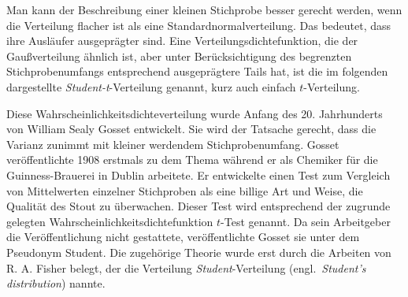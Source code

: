 
Man kann der Beschreibung einer kleinen Stichprobe besser gerecht werden, wenn die
Verteilung flacher ist als eine Standardnormalverteilung. Das bedeutet, dass ihre Ausläufer
ausgeprägter sind.
Eine Verteilungsdichtefunktion, die der Gaußverteilung ähnlich ist, aber unter
Berücksichtigung des begrenzten Stichprobenumfangs entsprechend ausgeprägtere Tails hat,
ist die im folgenden dargestellte \textsl{Student-t}-Verteilung genannt, kurz auch
einfach $t$-Verteilung.


Diese Wahrscheinlichkeitsdichteverteilung wurde Anfang des 20. Jahrhunderts von
William Sealy Gosset entwickelt. Sie wird der
Tatsache gerecht, dass die Varianz zunimmt mit kleiner werdendem Stichprobenumfang.
Gosset veröffentlichte 1908 erstmals zu dem Thema während er als Chemiker für die Guinness-Brauerei
in Dublin arbeitete. Er entwickelte einen Test zum Vergleich von Mittelwerten
einzelner Stichproben als eine billige Art und Weise, die Qualität des Stout
zu überwachen. Dieser Test wird entsprechend der zugrunde gelegten Wahrscheinlichkeitsdichtefunktion
$t$-Test genannt.
Da sein Arbeitgeber die Veröffentlichung nicht gestattete, veröffentlichte Gosset sie unter
dem Pseudonym Student. Die zugehörige Theorie wurde erst durch die
Arbeiten von R. A. Fisher belegt, der die Verteilung \textsl{Student}-Verteilung (engl.\
\textsl{Student's distribution}) nannte.

